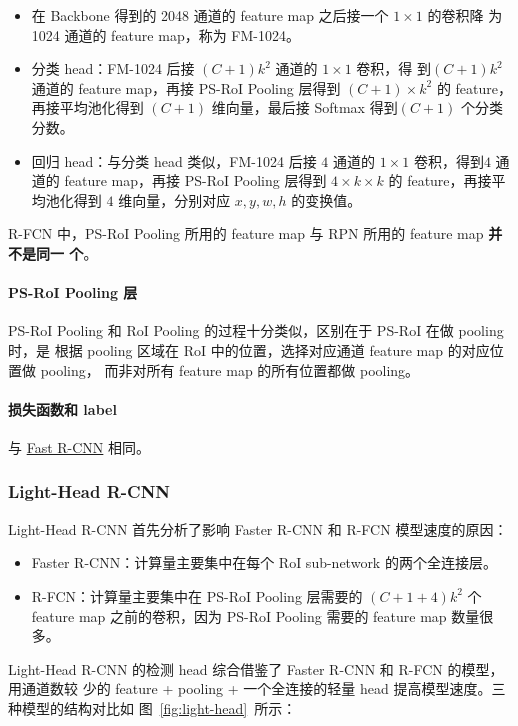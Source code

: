 \begin{itemize}
  \item 在 Backbone 得到的 2048 通道的 feature map 之后接一个 $1 \times 1$ 的卷积降
    为 1024 通道的 feature map，称为 FM-1024。
  \item 分类 head：FM-1024 后接 $(C+1)k^2$ 通道的 $1 \times 1$ 卷积，得
    到$(C+1)k^2$ 通道的 feature map，再接 PS-RoI Pooling 层得到 $(C+1) \times
    k^2$ 的 feature，再接平均池化得到 $(C+1)$ 维向量，最后接 Softmax 得到$(C+1)$
    个分类分数。
  \item 回归 head：与分类 head 类似，FM-1024 后接 $4$ 通道的 $1 \times 1$
    卷积，得到$4$ 通道的 feature map，再接 PS-RoI Pooling 层得到 $4
    \times k \times k$ 的 feature，再接平均池化得到 $4$ 维向量，分别对应 $x, y,
    w, h$ 的变换值。
\end{itemize}

R-FCN 中，PS-RoI Pooling 所用的 feature map 与 RPN 所用的 feature map \textbf{并不是同一
个}。

\paragraph{PS-RoI Pooling 层}
PS-RoI Pooling 和 RoI Pooling 的过程十分类似，区别在于 PS-RoI 在做 pooling 时，是
根据 pooling 区域在 RoI 中的位置，选择对应通道 feature map 的对应位置做 pooling，
而非对所有 feature map 的所有位置都做 pooling。

\paragraph{损失函数和 label}
与 \hyperref[subsec:Fast-R-CNN]{Fast R-CNN} 相同。

\subsubsection{Light-Head R-CNN}
Light-Head R-CNN 首先分析了影响 Faster R-CNN 和 R-FCN 模型速度的原因：

\begin{itemize}
  \item Faster R-CNN：计算量主要集中在每个 RoI sub-network 的两个全连接层。
  \item R-FCN：计算量主要集中在 PS-RoI Pooling 层需要的 $(C+1+4)k^2$ 个 feature
    map 之前的卷积，因为 PS-RoI Pooling 需要的 feature map 数量很多。
\end{itemize}

Light-Head R-CNN 的检测 head 综合借鉴了 Faster R-CNN 和 R-FCN 的模型，用通道数较
少的 feature + pooling + 一个全连接的轻量 head 提高模型速度。三种模型的结构对比如
图~\ref{fig:light-head}~所示：


